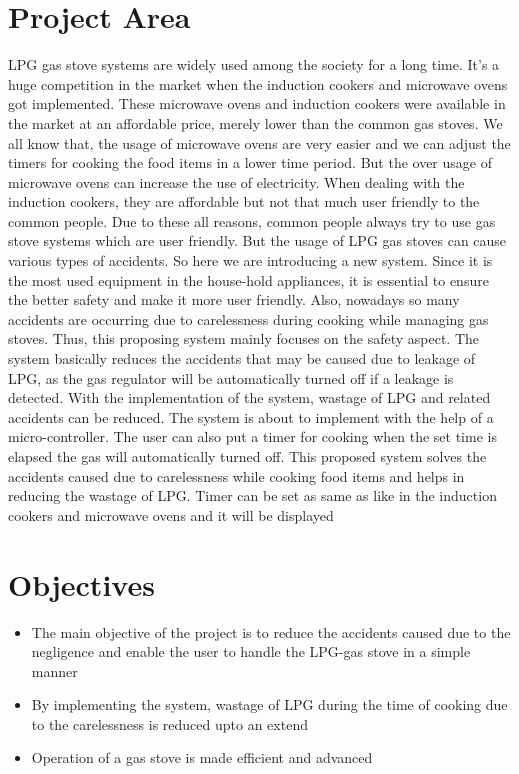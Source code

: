 \documentclass[a4paper,12pt]{report}
\begin{document}
\section{Project Area}
\par LPG gas stove systems are widely used among the society for a long time. It's a huge competition
in the market when the induction cookers and microwave ovens got implemented. These
microwave ovens and induction cookers were available in the market at an affordable price, merely
lower than the common gas stoves. We all know that, the usage of microwave ovens are very easier
and we can adjust the timers for cooking the food items in a lower time period. But the over usage
of microwave ovens can increase the use of electricity. When dealing with the induction cookers,
they are affordable but not that much user friendly to the common people.
Due to these all reasons, common people always try to use gas stove systems which are user
friendly. But the usage of LPG gas stoves can cause various types of accidents. So here we are
introducing a new system. Since it is the most used equipment in the house-hold appliances, it is
essential to ensure the better safety and make it more user friendly. Also, nowadays so many
accidents are occurring due to carelessness during cooking while managing gas stoves. Thus, this
proposing system mainly focuses on the safety aspect. The system basically reduces the accidents
that may be caused due to leakage of LPG, as the gas regulator will be automatically turned off if
a leakage is detected. With the implementation of the system, wastage of LPG and related accidents
can be reduced. The system is about to implement with the help of a micro-controller.
The user can also put a timer for cooking when the set time is elapsed the gas will automatically
turned off. This proposed system solves the accidents caused due to carelessness while cooking
food items and helps in reducing the wastage of LPG. Timer can be set as same as like in the
induction cookers and microwave ovens and it will be displayed

\newpage
\section{Objectives}
\begin{itemize}
    \item The main objective of the project is to reduce the accidents caused due to the negligence
    and enable the user to handle the LPG-gas stove in a simple manner
    \item By implementing the system, wastage of LPG during the time of cooking due to the
    carelessness is reduced upto an extend
    \item Operation of a gas stove is made efficient and advanced
\end{itemize}
\end{document}
